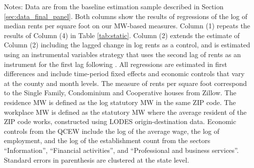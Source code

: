 \begin{table}[hbt!]
    \begin{minipage}{.95\textwidth} \footnotesize
        \vspace{2mm}
        Notes: 
        Data are from the baseline estimation sample described in Section 
        \ref{sec:data_final_panel}.
        Both columns show the results of regressions of the log of 
        median rents per square foot on our MW-based measures.
        Column (1) repeats the results of Column (4) in Table \ref{tab:static}.
        Column (2) extends the estimate of Column (2) including the lagged 
        change in log rents as a control, and is estimated using an 
        instrumental variables strategy that uses the second lag of rents
        as an instrument for the first lag following \textcite{ArellanoBond1991}.
        All regressions are estimated in first differences and include 
        time-period fixed effects and economic controls that vary at the 
        county and month levels.
        The measure of rents per square foot correspond to the Single Family, 
        Condominium and Cooperative houses from Zillow.
        The residence MW is defined as the log statutory MW in the same ZIP code.
        The workplace MW is defined as the statutory MW where the average 
        resident of the ZIP code works, constructed using LODES 
        origin-destination data.
        Economic controls from the QCEW include the log of the average wage, 
        the log of employment, and the log of the establishment count from the 
        sectors ``Information'', ``Financial activities'', and ``Professional
        and business services''.
        Standard errors in parenthesis are clustered at the state level.
    \end{minipage}
\end{table}
